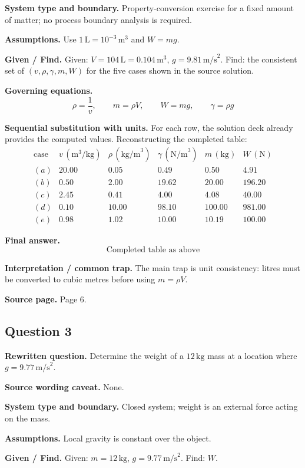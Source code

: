\textbf{System type and boundary.} Property-conversion exercise for a fixed amount of matter; no process boundary analysis is required.

\textbf{Assumptions.} Use $1\,\text{L}=10^{-3}\,\text{m}^3$ and $W=mg$.

\textbf{Given / Find.}
Given: $V=104\,\text{L}=0.104\,\text{m}^3$, $g=9.81\,\text{m/s}^2$.
Find: the consistent set of $(v,\rho,\gamma,m,W)$ for the five cases shown in the source solution.

\textbf{Governing equations.}
\[
\rho=\frac{1}{v},\qquad m=\rho V,\qquad W=mg,\qquad \gamma=\rho g
\]

\textbf{Sequential substitution with units.}
For each row, the solution deck already provides the computed values. Reconstructing the completed table:
\[
\begin{array}{c|ccccc}
\text{case} & v\,(\text{m}^3/\text{kg}) & \rho\,(\text{kg/m}^3) & \gamma\,(\text{N/m}^3) & m\,(\text{kg}) & W\,(\text{N})\\
\hline
(a) & 20.00 & 0.05 & 0.49 & 0.50 & 4.91\\
(b) & 0.50 & 2.00 & 19.62 & 20.00 & 196.20\\
(c) & 2.45 & 0.41 & 4.00 & 4.08 & 40.00\\
(d) & 0.10 & 10.00 & 98.10 & 100.00 & 981.00\\
(e) & 0.98 & 1.02 & 10.00 & 10.19 & 100.00
\end{array}
\]

\textbf{Final answer.}
\[
\boxed{\text{Completed table as above}}
\]

\textbf{Interpretation / common trap.} The main trap is unit consistency: litres must be converted to cubic metres before using $m=\rho V$.

\textbf{Source page.} Page 6.

\subsection*{Question 3}
\textbf{Rewritten question.} Determine the weight of a $12\,\text{kg}$ mass at a location where $g=9.77\,\text{m/s}^2$.

\textbf{Source wording caveat.} None.

\textbf{System type and boundary.} Closed system; weight is an external force acting on the mass.

\textbf{Assumptions.} Local gravity is constant over the object.

\textbf{Given / Find.}
Given: $m=12\,\text{kg}$, $g=9.77\,\text{m/s}^2$.
Find: $W$.


